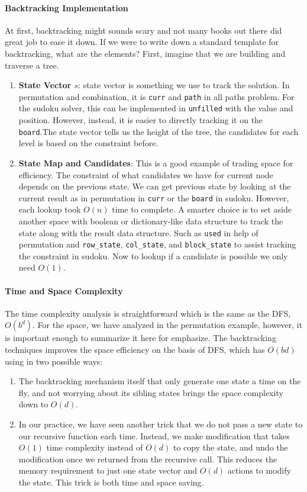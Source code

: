 \documentclass[../main.tex]{subfiles}
\begin{document}
\paragraph{Backtracking Implementation} At first, backtracking might sounds scary and not many books out there did great job to ease it down. If we were to write down a standard template for backtracking, what are the elements? First, imagine that we are building and traverse a tree.
 \begin{enumerate}
     \item \textbf{State Vector $s$}: state vector is something we use to track the solution. In permutation and combination, it is \texttt{curr} and \texttt{path} in all paths problem. For the sudoku solver, this can be implemented in \texttt{unfilled} with the value and position. However, instead, it is easier to directly tracking it on the \texttt{board}.The state vector tells us the height of the tree, the candidates for each level is based on the constraint before. 
     \item \textbf{State Map and Candidates}: This is a good example of trading space for efficiency. The constraint of what candidates we have for current node depends on the previous state. We can get previous state by looking at the current result as in permutation in \texttt{curr} or the \texttt{board} in sudoku. However, each lookup took $O(n)$ time to complete. A smarter choice is to set aside another space with boolean or dictionary-like data structure to track the state along with the result data structure. Such as \texttt{used} in help of permutation and \texttt{row\_state}, \texttt{col\_state}, and \texttt{block\_state} to assist tracking the constraint in sudoku. Now to lookup if a candidate is possible we only need $O(1)$. 
 \end{enumerate}
 
 \paragraph{Time and Space Complexity} The time complexity analysis is straightforward which is the same as the DFS, $O(b^d)$. For the space, we have analyzed in the permutation example, however, it is important enough to summarize it here for emphasize. The backtracking techniques improves the space efficiency on the basis of DFS, which has $O(bd)$ using in two possible ways:
 \begin{enumerate}
     \item The backtracking mechanism itself that only generate one state a time on the fly, and not worrying about its sibling states brings the space complexity down to $O(d)$. 
     \item In our practice, we have seen another trick that we do not pass a new state to our recursive function each time. Instead, we make modification that takes $O(1)$ time complexity instead of $O(d)$ to copy the state, and undo the modification once we returned from the recursive call. This reduces the memory requirement to just one state vector and $O(d)$ actions to modify the state. This trick is both time and space saving.
 \end{enumerate}
\end{document}
